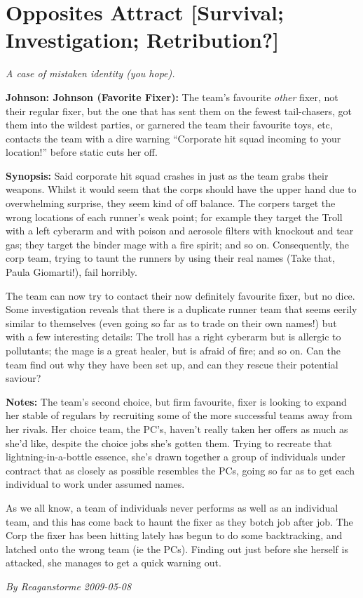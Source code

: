 \documentclass[letterpaper,twocolumn,10.5pt]{article}
\newenvironment{scenario}[6]
	{
		\section{#1 {\small[#2]}}
		\textit{#3}
		\def\TMPSCENARIO{#4 #5}
	}
	{\small\textit{By \TMPSCENARIO}}
\newcommand{\johnson}[2]{\textbf{Johnson: #1 (#2):}}
\newcommand{\synopsis}{\textbf{Synopsis: }}
\newcommand{\notes}{\textbf{Notes: }}
\begin{document}
\begin{scenario}{Opposites Attract}
	{Survival; Investigation; Retribution?}
	{ A case of mistaken identity (you hope).}
	{Reaganstorme}
	{2009-05-08}
	{https://forum.rpg.net/showthread.php?321504-Shadowrun-4th-101-Instant-Scenarios\&p=10333218#post10333218}

\johnson{Johnson}{Favorite Fixer} The team's favourite \textit{other} fixer, not their regular fixer, but the one that has sent them on the fewest tail-chasers, got them into the wildest parties, or garnered the team their favourite toys, etc, contacts the team with a dire warning ``Corporate hit squad incoming to your location!'' before static cuts her off.

\synopsis Said corporate hit squad crashes in just as the team grabs their weapons. Whilst it would seem that the corps should have the upper hand due to overwhelming surprise, they seem kind of off balance. The corpers target the wrong locations of each runner's weak point; for example they target the Troll with a left cyberarm and with poison and aerosole filters with knockout and tear gas; they target the binder mage with a fire spirit; and so on. Consequently, the corp team, trying to taunt the runners by using their real names (Take that, Paula Giomarti!), fail horribly.

The team can now try to contact their now definitely favourite fixer, but no dice. Some investigation reveals that there is a duplicate runner team that seems eerily similar to themselves (even going so far as to trade on their own names!) but with a few interesting details: The troll has a right cyberarm but is allergic to pollutants; the mage is a great healer, but is afraid of fire; and so on. Can the team find out why they have been set up, and can they rescue their potential saviour?

\notes The team's second choice, but firm favourite, fixer is looking to expand her stable of regulars by recruiting some of the more successful teams away from her rivals. Her choice team, the PC's, haven't really taken her offers as much as she'd like, despite the choice jobs she's gotten them. Trying to recreate that lightning-in-a-bottle essence, she's drawn together a group of individuals under contract that as closely as possible resembles the PCs, going so far as to get each individual to work under assumed names.

As we all know, a team of individuals never performs as well as an individual team, and this has come back to haunt the fixer as they botch job after job. The Corp the fixer has been hitting lately has begun to do some backtracking, and latched onto the wrong team (ie the PCs). Finding out just before she herself is attacked, she manages to get a quick warning out.


\end{scenario}
\end{document}
